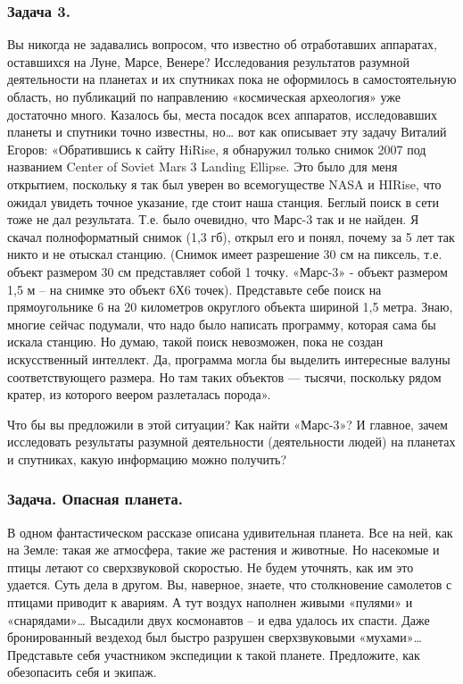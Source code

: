 \documentclass[11pt,a4paper]{article}
\begin{document}
\subsubsection*{Задача 3.}
Вы никогда не задавались вопросом, что известно об отработавших аппаратах,
оставшихся на Луне, Марсе, Венере? Исследования результатов разумной
деятельности на планетах и их спутниках пока не оформилось в самостоятельную
область, но публикаций по направлению «космическая археология» уже достаточно
много. Казалось бы, места посадок всех аппаратов, исследовавших планеты и
спутники точно известны, но… вот как описывает эту задачу Виталий Егоров:
«Обратившись к сайту HiRise, я обнаружил только снимок 2007 под названием
Center of Soviet Mars 3 Landing Ellipse. Это было для меня открытием,
поскольку я так был уверен во всемогуществе NASA и HIRise, что ожидал увидеть
точное указание, где стоит наша станция. Беглый поиск в сети тоже не дал
результата. Т.е. было очевидно, что Марс-3 так и не найден. Я скачал
полноформатный снимок (1,3 гб), открыл его и понял, почему за 5 лет так никто
и не отыскал станцию. (Снимок имеет разрешение 30 см на пиксель, т.е. объект
размером 30 см представляет собой 1 точку. «Марс-3» - объект размером 1,5 м –
на снимке это объект 6Х6 точек). Представьте себе поиск на прямоугольнике 6 на
20 километров округлого объекта шириной 1,5 метра. Знаю, многие сейчас
подумали, что надо было написать программу, которая сама бы искала станцию. Но
думаю, такой поиск невозможен, пока не создан искусственный интеллект. Да,
программа могла бы выделить интересные валуны соответствующего размера. Но там
таких объектов — тысячи, поскольку рядом кратер, из которого веером
разлеталась порода».

Что бы вы предложили в этой ситуации? Как найти «Марс-3»? И главное, зачем
исследовать результаты разумной деятельности (деятельности людей) на планетах
и спутниках, какую информацию можно получить?

\subsubsection*{Задача. Опасная планета.}
В одном фантастическом рассказе описана удивительная планета. Все на ней, как
на Земле: такая же атмосфера, такие же растения и животные. Но насекомые и
птицы летают со сверхзвуковой скоростью. Не будем уточнять, как им это
удается. Суть дела в другом. Вы, наверное, знаете, что столкновение самолетов
с птицами приводит к авариям. А тут воздух наполнен живыми «пулями» и
«снарядами»… Высадили двух космонавтов – и едва удалось их спасти. Даже
бронированный вездеход был быстро разрушен сверхзвуковыми «мухами»…
Представьте себя участником экспедиции к такой планете. Предложите, как
обезопасить себя и экипаж.
\end{document}

